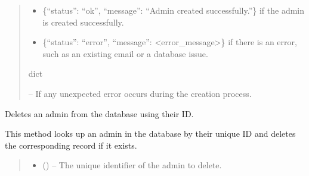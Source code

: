 \documentclass[letterpaper,10pt,english]{sphinxmanual}
\begin{document}
\begin{fulllineitems}
\begin{fulllineitems}
\begin{quote}
\begin{description}
\begin{itemize}
\end{itemize}

\sphinxAtStartPar
\begin{description}
\begin{itemize}
\item {} 
\sphinxAtStartPar
\{“status”: “ok”, “message”: “Admin created successfully.”\} if the admin is created successfully.

\item {} 
\sphinxAtStartPar
\{“status”: “error”, “message”: <error\_message>\} if there is an error, such as an existing email or a database issue.

\end{itemize}

\end{description}


\sphinxAtStartPar
dict

\sphinxAtStartPar
{} – If any unexpected error occurs during the creation process.

\end{description}\end{quote}

\end{fulllineitems}


\begin{fulllineitems}
\label{\detokenize{app.controllers:app.controllers.admin_controller.AdminController.deleteAdmin}}
\pysigstartsignatures
\pysiglinewithargsret
{}
{\sphinxparamcomma {}}
{}
\pysigstopsignatures
\sphinxAtStartPar
Deletes an admin from the database using their ID.

\sphinxAtStartPar
This method looks up an admin in the database by their unique ID and deletes
the corresponding record if it exists.
\begin{quote}\begin{description}
\begin{itemize}
\item {} 
\sphinxAtStartPar
{} () – The unique identifier of the admin to delete.


\end{itemize}
\end{description}
\end{quote}
\end{fulllineitems}
\end{fulllineitems}
\end{document}
